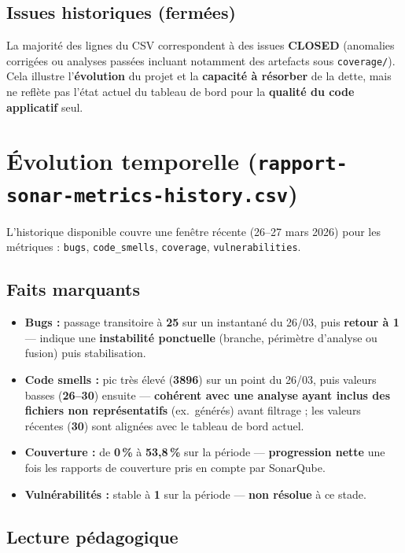 \documentclass[11pt,a4paper]{article}
\begin{document}
\subsection{Issues historiques (fermées)}

La majorité des lignes du CSV correspondent à des issues \textbf{CLOSED} (anomalies corrigées ou analyses passées incluant notamment des artefacts sous \texttt{coverage/}). Cela illustre l'\textbf{évolution} du projet et la \textbf{capacité à résorber} de la dette, mais ne reflète pas l'état actuel du tableau de bord pour la \textbf{qualité du code applicatif} seul.

\section{Évolution temporelle (\texttt{rapport-sonar-metrics-history.csv})}

L'historique disponible couvre une fenêtre récente (26--27 mars 2026) pour les métriques : \texttt{bugs}, \texttt{code\_smells}, \texttt{coverage}, \texttt{vulnerabilities}.

\subsection{Faits marquants}

\begin{itemize}
  \item \textbf{Bugs :} passage transitoire à \textbf{25} sur un instantané du 26/03, puis \textbf{retour à 1} --- indique une \textbf{instabilité ponctuelle} (branche, périmètre d'analyse ou fusion) puis stabilisation.
  \item \textbf{Code smells :} pic très élevé (\textbf{3896}) sur un point du 26/03, puis valeurs basses (\textbf{26--30}) ensuite --- \textbf{cohérent avec une analyse ayant inclus des fichiers non représentatifs} (ex.\ générés) avant filtrage ; les valeurs récentes (\textbf{30}) sont alignées avec le tableau de bord actuel.
  \item \textbf{Couverture :} de \textbf{0\,\%} à \textbf{53,8\,\%} sur la période --- \textbf{progression nette} une fois les rapports de couverture pris en compte par SonarQube.
  \item \textbf{Vulnérabilités :} stable à \textbf{1} sur la période --- \textbf{non résolue} à ce stade.
\end{itemize}

\subsection{Lecture pédagogique}
\end{document}
